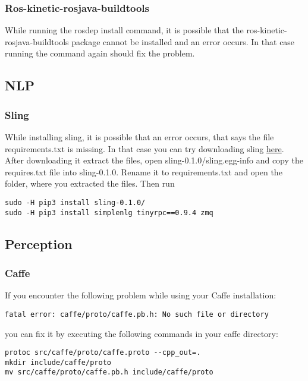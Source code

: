 \documentclass[main.tex]{subfiles}
\begin{document}
	\subsubsection{Ros-kinetic-rosjava-buildtools}
	While running the rosdep install command, it is possible that the ros-kinetic-rosjava-buildtools package cannot be installed and an error occurs. In that case running the command again should fix the problem.


	\subsection{NLP}
	\subsubsection{Sling}
	While installing sling, it is possible that an error occurs, that says the file requirements.txt is missing. In that case you can try downloading sling \href{https://pypi.org/project/sling/#files}{here}. After downloading it extract the files, open sling-0.1.0/sling.egg-info and copy the requires.txt file into sling-0.1.0. Rename it to requirements.txt and open the folder, where you extracted the files. Then run \\
	\begin{lstlisting}
sudo -H pip3 install sling-0.1.0/
sudo -H pip3 install simplenlg tinyrpc==0.9.4 zmq
\end{lstlisting}

	\subsection{Perception}
	\subsubsection{Caffe}
	
	If you encounter the following problem while using your Caffe installation:

\begin{lstlisting}
fatal error: caffe/proto/caffe.pb.h: No such file or directory
\end{lstlisting}

you can fix it by executing the following commands in your caffe directory:


\begin{lstlisting}
protoc src/caffe/proto/caffe.proto --cpp_out=.
mkdir include/caffe/proto
mv src/caffe/proto/caffe.pb.h include/caffe/proto
\end{lstlisting}
	
\end{document}

